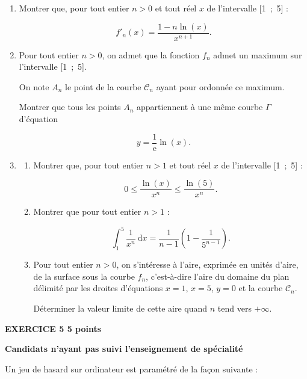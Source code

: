 \documentclass[10pt,a4paper]{article}
\begin{document}
\begin{enumerate}
\item Montrer que, pour tout entier $n > 0$ et tout réel $x$ de l'intervalle [1~;~5] :

\[f'_n(x) = \dfrac{1- n\ln (x)}{x^{n+1}}.\]

\item  Pour tout entier $n > 0$, on admet que la fonction $f_n$ admet un maximum sur l'intervalle [1~;~5].

On note $A_n$ le point de la courbe $\mathcal{C}_n$ ayant pour ordonnée ce maximum.

Montrer que tous les points $A_n$ appartiennent à une même courbe $\Gamma$ d'équation

\[y = \dfrac{1}{\text{e}} \ln (x).\]

\item 
	\begin{enumerate}
		\item Montrer que, pour tout entier $n > 1$ et tout réel $x$ de l'intervalle [1~;~5] :

\[0 \leqslant \dfrac{\ln (x)}{x^n} \leqslant \dfrac{\ln (5)}{x^n}.\]
		
		\item  Montrer que pour tout entier $n > 1$ :
		
\[\displaystyle\int_1^5 \dfrac{1}{x^n} \:\text{d}x = \dfrac{1}{n - 1}\left(1 - \dfrac{1}{5^{n - 1}} \right).\]

		\item  Pour tout entier $n > 0$, on s'intéresse à l'aire, exprimée en unités d'aire, de la surface sous la courbe $f_n$, c'est-à-dire l'aire du domaine du plan délimité par les droites d'équations $x = 1$, $x = 5$, $y = 0$ et la courbe $\mathcal{C}_n$.

Déterminer la valeur limite de cette aire quand $n$ tend vers $+ \infty$.
	\end{enumerate}
\end{enumerate}

\vspace{0.5cm}

\textbf{EXERCICE 5 \hfill 5 points}

\textbf{Candidats n'ayant pas suivi l'enseignement de spécialité}

\medskip

Un jeu de hasard sur ordinateur est paramétré de la façon suivante :

\medskip
\end{document}
